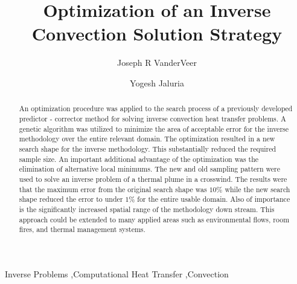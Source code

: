 \documentclass[preprint,12pt]{elsarticle}
\begin{document}
\begin{frontmatter}
\title{Optimization of an Inverse Convection Solution Strategy}

\author{Joseph R VanderVeer}
\author{Yogesh Jaluria}

\address{Department of Mechanical and Aerospace Engineering: Rutgers University, 98 Brett Rd, Piscataway NJ, 08854}



\begin{abstract}
An optimization procedure was applied to the search process of a previously developed predictor - corrector method for solving inverse convection heat transfer problems.  A genetic algorithm was utilized to minimize the area of acceptable error for the inverse methodology over the entire relevant domain.  The optimization resulted in a new search shape for the inverse methodology.  This substantially reduced the required sample size.  An important additional advantage of the optimization was the elimination of alternative local minimums.  The new and old sampling pattern were used to solve an inverse problem of a thermal plume in a crosswind.  The results were that the maximum error from the original search shape was $10\%$ while the new search shape reduced the error to under $1\%$ for the entire usable domain.  Also of importance is the significantly increased spatial range of the methodology down stream.  This approach could be extended to many applied areas such as environmental flows, room fires, and thermal management systems.




\end{abstract}
\begin{keyword}
Inverse Problems \sep Computational Heat Transfer \sep Convection
\end{keyword}
\end{frontmatter}
\end{document}
